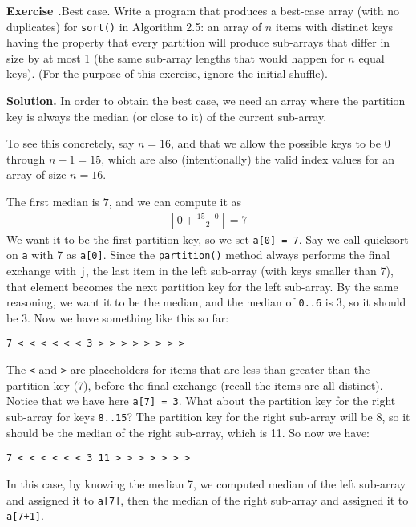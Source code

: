 \documentclass[12pt, a4paper]{article}
\newenvironment{ex}[2][Exercise]
{\par\medskip\noindent \textbf{#1 #2.}}
{\medskip}
\newenvironment{sol}[1][Solution]
{\par\medskip\noindent \textbf{#1.} }
{\medskip}
\begin{document}
	\begin{ex}{16}
		\emph{Best case}. Write a program that produces a best-case array (with no duplicates)
		for \texttt{sort()} in Algorithm 2.5: an array of $n$ items with distinct keys
		having the property that every partition will produce sub-arrays that differ in
		size by at most 1 (the same sub-array lengths that would happen for $n$ equal
		keys). (For the purpose of this exercise, ignore the initial shuffle).
	\end{ex}
	\begin{sol}
		In order to obtain the best case, we need an array where the partition
		key is always the median (or close to it) of the current sub-array.
		
		To see this concretely, say $n=16$, and that we allow the possible keys
		to be $0$ through $n-1=15$, which are also (intentionally) the valid index
		values for an array of size $n=16$.
		
		The first median is $7$, and we can compute it as
		\begin{align*}
			\left\lfloor0 + \frac{15 - 0}{2}\right\rfloor = 7
		\end{align*}
		We want it to be the first partition key, so we set \texttt{a[0] = 7}.
		Say we call quicksort on \texttt{a} with 7 as \texttt{a[0]}. Since
		the \texttt{partition()} method always performs the final exchange
		with \texttt{j}, the last item in the left sub-array (with keys smaller
		than 7), that element becomes the next partition key for the left
		sub-array. By the same reasoning, we want it to be the median,
		and the median of \texttt{0..6} is 3, so it should be 3. Now
		we have something like this so far:
		\begin{lstlisting}[language={}]
7 < < < < < < 3 > > > > > > > >
		\end{lstlisting}
		The \texttt{<} and \texttt{>} are placeholders for items that are less
		than greater than the partition key (7), before the final exchange (recall
		the items are all distinct). Notice that we have here \texttt{a[7] = 3}.
		What about the partition key for the right sub-array for keys \texttt{8..15}?
		The partition key for the right sub-array will be 8, so it should be
		the median of the right sub-array, which is 11. So now we have:
		\begin{lstlisting}[language={}]
7 < < < < < < 3 11 > > > > > > >
		\end{lstlisting}
		In this case, by knowing the median 7, we computed median of the left sub-array
		and assigned it to \texttt{a[7]}, then the median of the right sub-array
		and assigned it to \texttt{a[7+1]}.
		

\end{sol}
\end{document}
